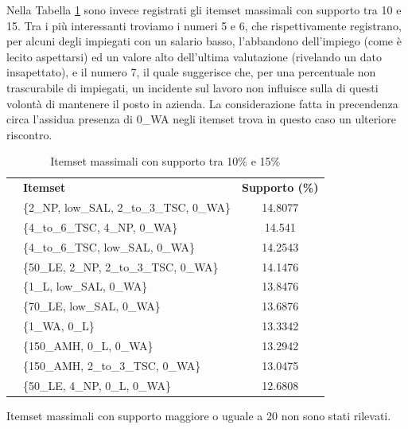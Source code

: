 \documentclass[a4paper]{article}
\newcounter{rowno}
\begin{document}
\noindent
Nella Tabella \ref{tab:maximal_10_15} sono invece registrati gli itemset massimali con supporto tra 10 e 15.
Tra i più interessanti troviamo i numeri 5 e 6, che rispettivamente registrano, per alcuni degli impiegati con un salario basso, l'abbandono dell'impiego (come è lecito aspettarsi) ed un valore alto dell'ultima valutazione (rivelando un dato insapettato), e il numero 7, il quale suggerisce che, per una percentuale non trascurabile di impiegati, un incidente sul lavoro non influisce sulla di questi volontà di mantenere il posto in azienda. 
La considerazione fatta in precendenza circa l'assidua presenza di 0\_WA negli itemset trova in questo caso un ulteriore riscontro.

\begin{table}[h]
\centering
\begingroup
\setlength{\tabcolsep}{5pt} %
\renewcommand{\arraystretch}{1} %
\setcounter{rowno}{0}

\begin{tabularx}{\textwidth}{|>{\stepcounter{rowno}\therowno}c|X|c|}
\hline
\multicolumn{1}{r}{\#} & {\textbf{Itemset}} & {\textbf{Supporto (\%)}} \\
 
& \{2\_NP, low\_SAL, 2\_to\_3\_TSC, 0\_WA\} & 14.8077 \\ 
& \{4\_to\_6\_TSC, 4\_NP, 0\_WA\} & 14.541 \\ 
& \{4\_to\_6\_TSC, low\_SAL, 0\_WA\} & 14.2543 \\ 
& \{50\_LE, 2\_NP, 2\_to\_3\_TSC, 0\_WA\} & 14.1476 \\ 
& \{1\_L, low\_SAL, 0\_WA\} & 13.8476 \\ 
& \{70\_LE, low\_SAL, 0\_WA\} & 13.6876 \\ 
& \{1\_WA, 0\_L\} & 13.3342 \\ 
& \{150\_AMH, 0\_L, 0\_WA\} & 13.2942 \\ 
& \{150\_AMH, 2\_to\_3\_TSC, 0\_WA\} & 13.0475 \\ 
& \{50\_LE, 4\_NP, 0\_L, 0\_WA\} & 12.6808 \\ 
 
\hline
\end{tabularx}
\endgroup
\caption{Itemset massimali con supporto tra 10\% e 15\%}
\label{tab:maximal_10_15}
\end{table}

\noindent
Itemset massimali con supporto maggiore o uguale a 20 non sono stati rilevati.
\end{document}
